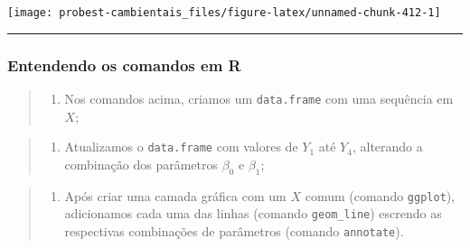 \documentclass[
]{book}
\newenvironment{Shaded}{\begin{snugshade}}{\end{snugshade}}
\newcommand{\AttributeTok}[1]{\textcolor[rgb]{0.77,0.63,0.00}{#1}}
\newcommand{\DecValTok}[1]{\textcolor[rgb]{0.00,0.00,0.81}{#1}}
\newcommand{\FunctionTok}[1]{\textcolor[rgb]{0.00,0.00,0.00}{#1}}
\newcommand{\NormalTok}[1]{#1}
\newcommand{\SpecialCharTok}[1]{\textcolor[rgb]{0.00,0.00,0.00}{#1}}
\newcommand{\StringTok}[1]{\textcolor[rgb]{0.31,0.60,0.02}{#1}}
\providecommand{\tightlist}{%
  \setlength{\itemsep}{0pt}\setlength{\parskip}{0pt}}
\begin{document}
\begin{Shaded}
\end{Shaded}

\begin{center}\texttt{[image: probest-cambientais\_files/figure-latex/unnamed-chunk-412-1]} \end{center}

\begin{center}\rule{0.5\linewidth}{0.5pt}\end{center}

\hypertarget{entendendo-os-comandos-em-r}{%
\subsubsection*{Entendendo os comandos em R}\label{entendendo-os-comandos-em-r}}

\begin{quote}
\begin{enumerate}
\def\labelenumi{\arabic{enumi}.}
\tightlist
\item
  Nos comandos acima, criamos um \texttt{data.frame} com uma sequência em \(X\);
\end{enumerate}
\end{quote}

\begin{quote}
\begin{enumerate}
\def\labelenumi{\arabic{enumi}.}
\setcounter{enumi}{1}
\tightlist
\item
  Atualizamos o \texttt{data.frame} com valores de \(Y_1\) até \(Y_4\), alterando a combinação dos parâmetros \(\beta_0\) e \(\beta_1\);
\end{enumerate}
\end{quote}

\begin{quote}
\begin{enumerate}
\def\labelenumi{\arabic{enumi}.}
\setcounter{enumi}{2}
\tightlist
\item
  Após criar uma camada gráfica com um \(X\) comum (comando \texttt{ggplot}), adicionamos cada uma das linhas (comando \texttt{geom\_line}) escrendo as respectivas combinações de parâmetros (comando \texttt{annotate}).
\end{enumerate}
\end{quote}
\end{document}
